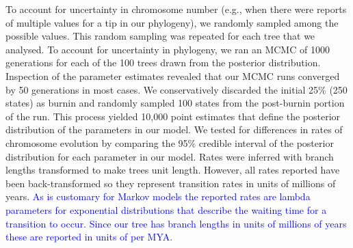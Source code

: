 \documentclass[]{rsos}%
\begin{document}
To account for uncertainty in chromosome number (e.g., when there were reports of multiple values for a tip in our phylogeny), we randomly sampled among the possible values.
This random sampling was repeated for each tree that we analysed.
To account for uncertainty in phylogeny, we ran an MCMC of 1000 generations for each of the 100 trees drawn from the posterior distribution.
Inspection of the parameter estimates revealed that our MCMC runs converged by 50 generations in most cases.  
We conservatively discarded the initial 25\% (250 states) as burnin and randomly sampled 100 states from the post-burnin portion of the run. 
This process yielded 10,000 point estimates that define the posterior distribution of the parameters in our model.
We tested for differences in rates of chromosome evolution by comparing the 95\% credible interval of the posterior distribution for each parameter in our model.
Rates were inferred with branch lengths transformed to make trees unit length.
However, all rates reported have been back-transformed so they represent transition rates in units of millions of years. 
\textcolor{blue}{As is customary for Markov models the reported rates are lambda parameters for exponential distributions that describe the waiting time for a transition to occur.
Since our tree has branch lengths in units of millions of years these are reported in units of per MYA.}
\end{document}
